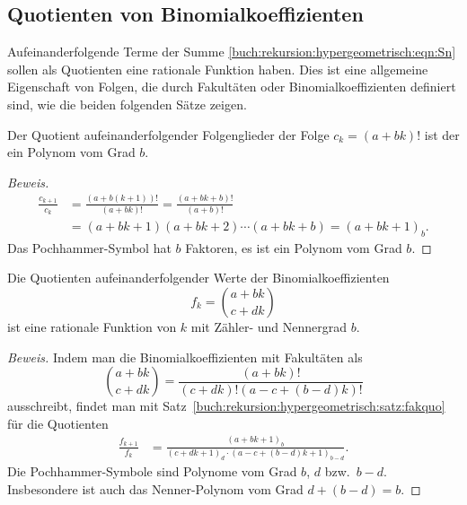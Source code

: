 %
%
\subsection{Quotienten von Binomialkoeffizienten
\label{buch:rekursion:hypergeometrisch:binomialkoeffizienten}}
Aufeinanderfolgende Terme der Summe
\eqref{buch:rekursion:hypergeometrisch:eqn:Sn}
sollen als Quotienten eine rationale Funktion haben.
Dies ist eine allgemeine Eigenschaft von Folgen, die durch Fakultäten
oder Binomialkoeffizienten definiert sind, wie die beiden folgenden
Sätze zeigen.

\begin{satz}
%
\label{buch:rekursion:hypergeometrisch:satz:fakquo}
Der Quotient aufeinanderfolgender Folgenglieder
der Folge $c_k=(a+bk)!$ ist der ein Polynom vom Grad $b$.
\end{satz}
\begin{proof}[Beweis]
\begin{align*}
\frac{c_{k+1}}{c_k}
&=
\frac{(a+b(k+1))!}{(a+bk)!}
=
\frac{(a+bk+b)!}{(a+b)!}
\\
&=
(a+bk+1)(a+bk+2)\cdots(a+bk+b)
=
(a+bk+1)_b.
\end{align*}
Das Pochhammer-Symbol hat $b$ Faktoren, es ist ein Polynom vom Grad $b$.
\end{proof}
%

\begin{satz}
%
\label{buch:rekursion:hypergeometrisch:satz:binomquo}
Die Quotienten aufeinanderfolgender Werte der Binomialkoeffizienten
\[
f_k
=
\binom{a+bk}{c+dk}
\]
ist eine rationale Funktion von $k$ mit Zähler- und Nennergrad $b$.
\end{satz}

\begin{proof}[Beweis]
Indem man die Binomialkoeffizienten mit Fakultäten als
\[
\binom{a+bk}{c+dk}
=
\frac{(a+bk)!}{(c+dk)!(a-c+(b-d)k)!}
\]
ausschreibt, findet man mit
Satz~\ref{buch:rekursion:hypergeometrisch:satz:fakquo}
für die Quotienten
\begin{align}
\frac{f_{k+1}}{f_k}
&=
\frac{(a+bk+1)_b}{(c+dk+1)_d\cdot(a-c+(b-d)k+1)_{b-d}}.
\label{buch:rekursion:eqn:binomquotient}
\end{align}
Die Pochhammer-Symbole sind Polynome vom Grad $b$, $d$ bzw.~$b-d$.
Insbesondere ist auch das Nenner-Polynom vom Grad $d+(b-d)=b$.
\end{proof}

